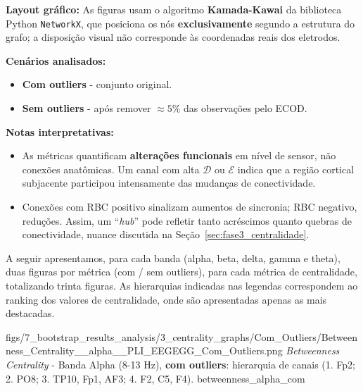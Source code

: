\noindent\textbf{Layout gráfico:} As figuras usam o algoritmo \textbf{Kamada-Kawai} da biblioteca Python \texttt{NetworkX}, que posiciona os nós \textbf{exclusivamente} segundo a estrutura do grafo; a disposição visual não corresponde às coordenadas reais dos eletrodos.

\noindent\textbf{Cenários analisados:}
\begin{itemize}
  \item \textbf{Com outliers} - conjunto original.
  \item \textbf{Sem outliers} - após remover \(\approx5\%\) das observações pelo ECOD.
\end{itemize}

\noindent\textbf{Notas interpretativas:}
\begin{itemize}
  \item As métricas quantificam \textbf{alterações funcionais} em nível de sensor, não conexões anatômicas. Um canal com alta \(\mathcal{D}\) ou \(\mathcal{E}\) indica que a região cortical subjacente participou intensamente das mudanças de conectividade.
  \item Conexões com RBC positivo sinalizam aumentos de sincronia; RBC negativo, reduções. Assim, um ``\textit{hub}'' pode refletir tanto acréscimos quanto quebras de conectividade, nuance discutida na Seção~\ref{sec:fase3_centralidade}.
\end{itemize}

A seguir apresentamos, para cada banda (alpha, beta, delta, gamma e theta), duas figuras por métrica (com / sem outliers), para cada métrica de centralidade, totalizando trinta figuras. As hierarquias indicadas nas legendas correspondem ao ranking dos valores de centralidade, onde são apresentadas apenas as mais destacadas.

\ultrawidefigure
{figs/7_bootstrap_results_analysis/3_centrality_graphs/Com_Outliers/Betweenness_Centrality__alpha__PLI_EEGEGG_Com_Outliers.png}
{\textit{Betweenness Centrality} - Banda Alpha (8-13 Hz), \textbf{com outliers}: hierarquia de canais (1. Fp2; 2. PO8; 3. TP10, Fp1, AF3; 4. F2, C5, F4).}
{betweenness_alpha_com}

